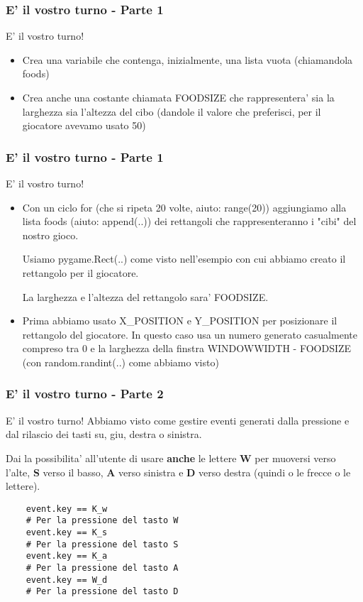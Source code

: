 \documentclass{beamer}
\begin{document}
\begin{frame}[fragile]
\frametitle{E' il vostro turno - Parte 1}
\begin{block}{E' il vostro turno!}
    \begin{itemize}
        \item Crea una variabile che contenga, inizialmente, una lista vuota (chiamandola foods)
        \item Crea anche una costante chiamata FOODSIZE che rappresentera' sia la larghezza sia l'altezza del cibo (dandole il valore che preferisci, per il giocatore avevamo usato 50)
    \end{itemize}{}
\end{block}
\end{frame}

\begin{frame}[fragile]
\frametitle{E' il vostro turno - Parte 1}
\begin{block}{E' il vostro turno!}
    \begin{itemize}
        \item Con un ciclo for (che si ripeta 20 volte, aiuto: range(20)) aggiungiamo alla lista foods  (aiuto: append(..)) dei rettangoli che rappresenteranno i "cibi" del nostro gioco.
        
        Usiamo pygame.Rect(..) come visto nell'esempio con cui abbiamo creato il rettangolo per il giocatore.
        
        La larghezza e l'altezza del rettangolo sara' FOODSIZE.
        \item Prima abbiamo usato X\_POSITION e Y\_POSITION per posizionare il rettangolo del giocatore. In questo caso usa un numero generato casualmente compreso tra 0 e la larghezza della finstra WINDOWWIDTH - FOODSIZE (con random.randint(..) come abbiamo visto)
    \end{itemize}{}
\end{block}
\end{frame}

\begin{frame}[fragile]
\frametitle{E' il vostro turno - Parte 2}
\begin{block}{E' il vostro turno!}
    Abbiamo visto come gestire eventi generati dalla pressione e dal rilascio dei tasti su, giu, destra o sinistra.
    
    Dai la possibilita' all'utente di usare \textbf{anche} le lettere \textbf{W} per muoversi verso l'alte, \textbf{S} verso il basso, \textbf{A} verso sinistra e \textbf{D} verso destra (quindi o le frecce o le lettere).
    
    \begin{lstlisting}
    event.key == K_w
    # Per la pressione del tasto W
    event.key == K_s
    # Per la pressione del tasto S
    event.key == K_a
    # Per la pressione del tasto A
    event.key == W_d
    # Per la pressione del tasto D
    \end{lstlisting}
\end{block}

\end{frame}
\end{document}
